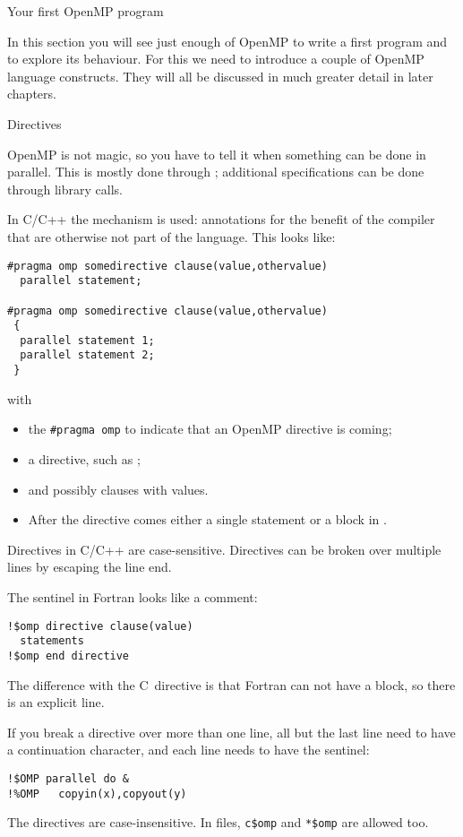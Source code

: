 
 {Your first OpenMP program}

In this section you will see just enough of OpenMP to write a first
program and to explore its behaviour. For this we need to introduce a
couple of OpenMP language constructs. They will all be discussed in
much greater detail in later chapters.

 {Directives}
\label{sec:omp-directives}

OpenMP is not magic, so you have to tell it when something
can be done in parallel. This is mostly done through ;
additional specifications can be done through library calls.

In C/C++ the  mechanism is used: annotations for
the benefit of the compiler that are otherwise not part of the
language. This looks like:
\begin{verbatim}
#pragma omp somedirective clause(value,othervalue)
  parallel statement;

#pragma omp somedirective clause(value,othervalue)
 {
  parallel statement 1;
  parallel statement 2;
 }
\end{verbatim}
with
\begin{itemize}
\item the \verb+#pragma omp+  to indicate that
  an OpenMP directive is coming;
\item a directive, such as ;
\item and possibly clauses with values.
\item After the directive comes either a single statement or a block
  in .
\end{itemize}
Directives in C/C++ are case-sensitive. Directives can be broken over
multiple lines by escaping the line end.

The sentinel in Fortran looks like a comment:
\begin{verbatim}
!$omp directive clause(value)
  statements
!$omp end directive
\end{verbatim}
The difference with the C~directive is that
Fortran can not have a block, so there is an explicit
 line.

If you break a directive over more than one line, all but the last line
need to have a continuation character, and each line needs to have the sentinel:
\begin{verbatim}
!$OMP parallel do &
!%OMP   copyin(x),copyout(y)
\end{verbatim}
The directives are case-insensitive. In
 files, \verb+c$omp+ and
\verb+*$omp+ are allowed too.

